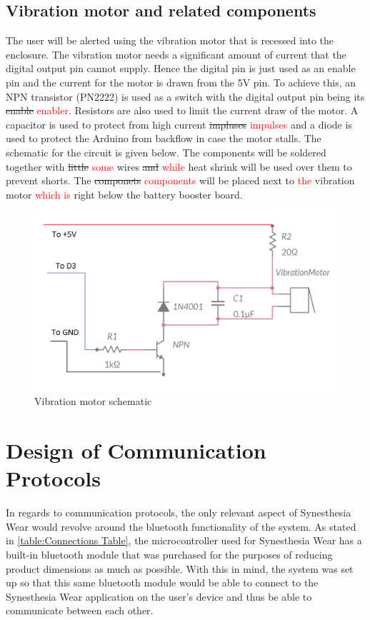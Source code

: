 \documentclass[12pt, titlepage]{article}
\begin{document}
\subsection{Vibration motor and related components}
The user will be alerted using the vibration motor that is recessed into the enclosure. The vibration motor needs a significant amount of current that the digital output pin cannot supply. Hence the digital pin is just used as an enable pin and the current for the motor is drawn from the 5V pin. To achieve this\textcolor{red}{,} an NPN transistor (PN2222) is used as a switch with the digital output pin being its \sout{enable} \textcolor{red}{enabler}. Resistors are also used to limit the current draw of the motor. A capacitor is used to protect from high current \sout{impluses} \textcolor{red}{impulses} and a diode is used to protect the Arduino from backflow in case the motor stalls. The schematic for the circuit is given below. The components will be soldered together with \sout{little} \textcolor{red}{some} wires \sout{and} \textcolor{red}{while} heat shrink will be used over them to prevent shorts. The \sout{componets} \textcolor{red}{components} will be placed next to \textcolor{red}{the} vibration motor \textcolor{red}{which is} right below the battery booster board. 

 \begin{figure}[H]
\centering
  \includegraphics[width=\textwidth,height=\textheight,keepaspectratio]{MotorSchematic.png}
  \caption{Vibration motor schematic}
  \label{Vibration motor schematic} 
\end{figure}

\section{Design of Communication Protocols}
In regards to communication protocols, the only relevant aspect of Synesthesia Wear would revolve around the bluetooth functionality of the system.
As stated in \autoref{table:Connections Table}, the microcontroller used for Synesthesia Wear has a built-in bluetooth module that was purchased for the purposes of reducing product dimensions as much as possible.
With this in mind, the system was set up so that this same bluetooth module would be able to connect to the Synesthesia Wear application on the user's device and thus be able to communicate between each other.
\end{document}
